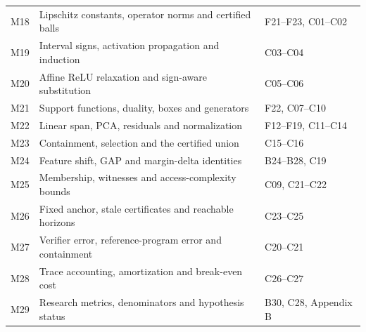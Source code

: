\begin{longtable}{@{}P{1.2cm}P{7.3cm}P{6.7cm}@{}}
M18 & Lipschitz constants, operator norms and certified balls & F21--F23, C01--C02\\
M19 & Interval signs, activation propagation and induction & C03--C04\\
M20 & Affine ReLU relaxation and sign-aware substitution & C05--C06\\
M21 & Support functions, duality, boxes and generators & F22, C07--C10\\
M22 & Linear span, PCA, residuals and normalization & F12--F19, C11--C14\\
M23 & Containment, selection and the certified union & C15--C16\\
M24 & Feature shift, GAP and margin-delta identities & B24--B28, C19\\
M25 & Membership, witnesses and access-complexity bounds & C09, C21--C22\\
M26 & Fixed anchor, stale certificates and reachable horizons & C23--C25\\
M27 & Verifier error, reference-program error and containment & C20--C21\\
M28 & Trace accounting, amortization and break-even cost & C26--C27\\
M29 & Research metrics, denominators and hypothesis status & B30, C28, Appendix B\\\bottomrule
\end{longtable}
\normalsize

\clearpage
